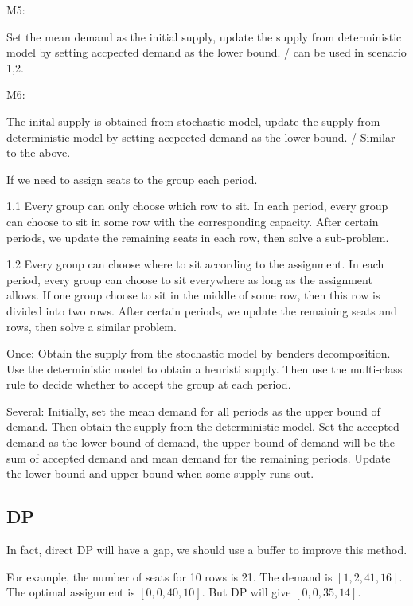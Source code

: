 M5: 

Set the mean demand as the initial supply, update the supply from deterministic model by setting accpected demand as the lower bound. / can be used in scenario 1,2.

M6: 

The inital supply is obtained from stochastic model, update the supply from deterministic model by setting accpected demand as the lower bound. / Similar to the above.




If we need to assign seats to the group each period.

1.1 Every group can only choose which row to sit.
In each period, every group can choose to sit in some row with the corresponding capacity. 
After certain periods, we update the remaining seats in each row, then solve a sub-problem. 

1.2 Every group can choose where to sit according to the assignment.
In each period, every group can choose to sit everywhere as long as the assignment allows. If one group choose to sit in the middle of some row, then this row is divided into two rows. 
After certain periods, we update the remaining seats and rows, then solve a similar problem.



Once: Obtain the supply from the stochastic model by benders decomposition. Use the deterministic model to obtain a heuristi supply. Then use the multi-class rule to decide whether to accept the group at each period.

Several: Initially, set the mean demand for all periods as the upper bound of demand. Then obtain the supply from the deterministic model. Set the accepted demand as the lower bound of demand, the upper bound of demand will be the sum of accepted demand and mean demand for the remaining periods. Update the lower bound and upper bound when some supply runs out.


\subsection{DP}


In fact, direct DP will have a gap, we should use a buffer to improve this method.

For example, the number of seats for 10 rows is 21. The demand is $[1,2,41,16]$. The optimal assignment is $[0, 0, 40, 10]$. But DP will give $[0, 0, 35, 14]$.

